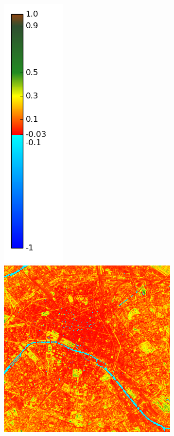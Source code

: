 \documentclass{book}
\begin{document}
\begin{figure}[H]
{\includegraphics[scale=0.2]{images/colormap.png}
\includegraphics[scale=0.25]{images/Paris/09_ndvi.png}
}
\end{figure}
\end{document}
